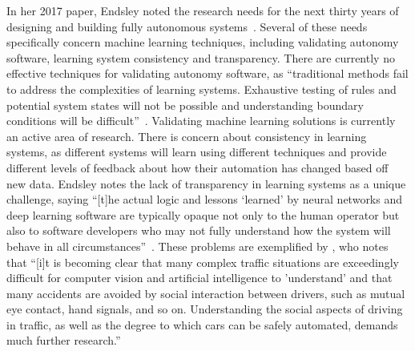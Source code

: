 In her 2017 paper, Endsley noted the research needs for the next thirty years of designing and building fully autonomous systems~\citep{endsley_here_2017}.
Several of these needs specifically concern machine learning techniques, including validating autonomy software, learning system consistency and transparency.
There are currently no effective techniques for validating autonomy software, as ``traditional methods fail to address the complexities of learning systems.
Exhaustive testing of rules and potential system states will not be possible and understanding boundary conditions will be difficult''~\citep{endsley_here_2017}.
Validating machine learning solutions is currently an active area of research.
There is concern about consistency in learning systems, as different systems will learn using different techniques and provide different levels of feedback about how their automation has changed based off new data.
Endsley notes the lack of transparency in learning systems as a unique challenge, saying ``[t]he actual logic and lessons `learned' by neural networks and deep learning software are typically opaque not only to the human operator but also to software developers who may not fully understand how the system will behave in all circumstances''~\citep{endsley_here_2017}.
These problems are exemplified by \citeauthor{sheridan_humanrobot_2016}, who notes that ``[i]t is becoming clear that many complex traffic situations are exceedingly difficult for computer vision and artificial intelligence to 'understand' and that many accidents are avoided by social interaction between drivers, such as mutual eye contact, hand signals, and so on.
Understanding the social aspects of driving in traffic, as well as the degree to which cars can be safely automated, demands much further research.''


